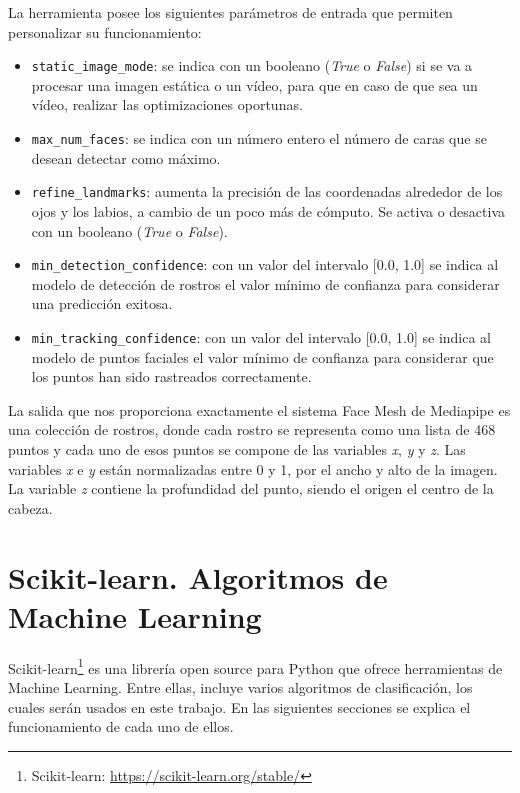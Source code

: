 La herramienta posee los siguientes parámetros de entrada que permiten personalizar su funcionamiento:
\begin{itemize}
    \item \verb|static_image_mode|: se indica con un booleano (\textit{True} o \textit{False}) si se va a procesar una imagen estática o un vídeo, para que en caso de que sea un vídeo, realizar las optimizaciones oportunas.
    
    \item \verb|max_num_faces|: se indica con un número entero el número de caras que se desean detectar como máximo.
    
    \item \verb|refine_landmarks|: aumenta la precisión de las coordenadas alrededor de los ojos y los labios, a cambio de un poco más de cómputo. Se activa o desactiva con un booleano (\textit{True} o \textit{False}).
    
    \item \verb|min_detection_confidence|: con un valor del intervalo [0.0, 1.0] se indica al modelo de detección de rostros el valor mínimo de confianza para considerar una predicción exitosa.
    
    \item \verb|min_tracking_confidence|: con un valor del intervalo [0.0, 1.0] se indica al modelo de puntos faciales el valor mínimo de confianza para considerar que los puntos han sido rastreados correctamente.
\end{itemize}

La salida que nos proporciona exactamente el sistema Face Mesh de Mediapipe es una colección de rostros, donde cada rostro se representa como una lista de 468 puntos y cada uno de esos puntos se compone de las variables \textit{x}, \textit{y} y \textit{z}. Las variables \textit{x} e \textit{y} están normalizadas entre 0 y 1, por el ancho y alto de la imagen. La variable \textit{z} contiene la profundidad del punto, siendo el origen el centro de la cabeza.

\section{Scikit-learn. Algoritmos de Machine Learning}

Scikit-learn\footnote{Scikit-learn: \url{https://scikit-learn.org/stable/}} es una librería open source para Python que ofrece herramientas de Machine Learning. Entre ellas, incluye varios algoritmos de clasificación, los cuales serán usados en este trabajo. En las siguientes secciones se explica el funcionamiento de cada uno de ellos.

